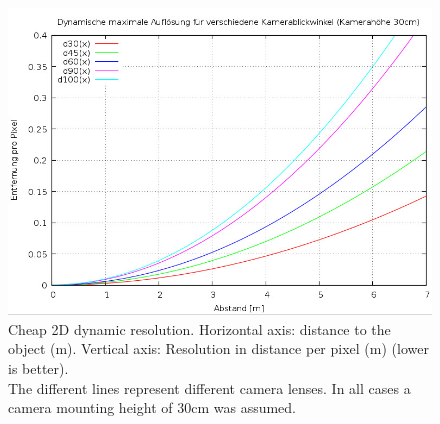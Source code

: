 \documentclass[a4paper
               ,10pt
               ,DIV=10 %
               ,BCOR=0.3cm
               ,pagesize %
               ,headings=small
               ,bibtotoc
               ]
               {scrartcl}
\begin{document}
\begin{figure}[H]
\begin{center}
\includegraphics[width=0.8\linewidth]{pic/scanner_aufloesung}
\caption{Cheap 2D dynamic resolution. Horizontal axis: distance to the object (m). Vertical axis: Resolution in distance per pixel (m) (lower is better).\\The different lines represent different camera lenses. In all cases a camera mounting height of 30cm was assumed.}
\label{figlaser2}
\end{center}
\end{figure}
\end{document}
